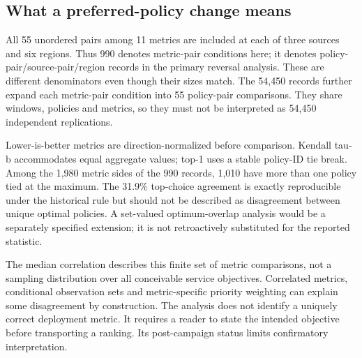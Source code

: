 \subsection{What a preferred-policy change means}
All 55 unordered pairs among 11 metrics are included at each of three
sources and six regions. Thus 990 denotes metric-pair conditions here;
it denotes policy-pair/source-pair/region records in the primary reversal
analysis. These are different denominators even though their sizes match.
The 54,450 records further expand each metric-pair condition into 55
policy-pair comparisons. They share windows, policies and metrics, so they
must not be interpreted as 54,450 independent replications.

Lower-is-better metrics are direction-normalized before comparison.
Kendall tau-b accommodates equal aggregate values; top-1 uses a stable
policy-ID tie break. Among the 1,980 metric sides of the 990 records,
1,010 have more than one policy tied at the maximum. The 31.9\% top-choice
agreement is exactly reproducible under the historical rule but should
not be described as disagreement between unique optimal policies. A
set-valued optimum-overlap analysis would be a separately specified
extension; it is not retroactively substituted for the reported statistic.

The median correlation describes this finite set of metric comparisons,
not a sampling distribution over all conceivable service objectives.
Correlated metrics, conditional observation sets and metric-specific
priority weighting can explain some disagreement by construction. The
analysis does not identify a uniquely correct deployment metric. It
requires a reader to state the intended objective before transporting a
ranking. Its post-campaign status limits confirmatory interpretation.
